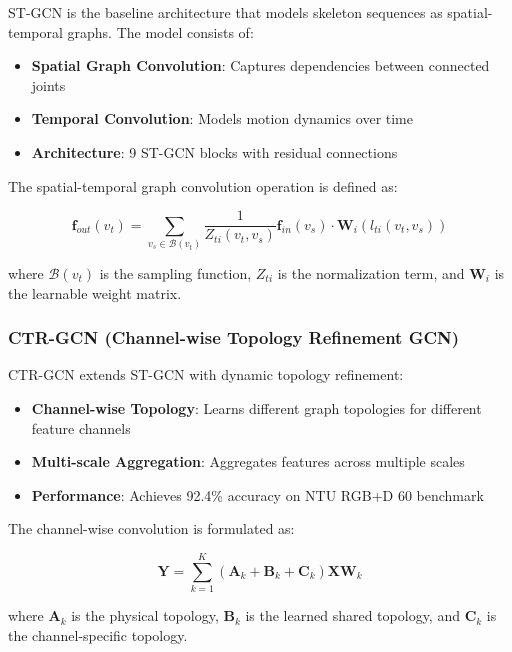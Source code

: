 \documentclass[11pt,a4paper]{article}
\begin{document}
ST-GCN is the baseline architecture that models skeleton sequences as spatial-temporal graphs. The model consists of:

\begin{itemize}
    \item \textbf{Spatial Graph Convolution}: Captures dependencies between connected joints
    \item \textbf{Temporal Convolution}: Models motion dynamics over time
    \item \textbf{Architecture}: 9 ST-GCN blocks with residual connections
\end{itemize}

The spatial-temporal graph convolution operation is defined as:

\begin{equation}
\mathbf{f}_{out}(v_t) = \sum_{v_s \in \mathcal{B}(v_t)} \frac{1}{Z_{ti}(v_t, v_s)} \mathbf{f}_{in}(v_s) \cdot \mathbf{W}_i(l_{ti}(v_t, v_s))
\end{equation}

where $\mathcal{B}(v_t)$ is the sampling function, $Z_{ti}$ is the normalization term, and $\mathbf{W}_i$ is the learnable weight matrix.

\subsubsection{CTR-GCN (Channel-wise Topology Refinement GCN)}

CTR-GCN extends ST-GCN with dynamic topology refinement:

\begin{itemize}
    \item \textbf{Channel-wise Topology}: Learns different graph topologies for different feature channels
    \item \textbf{Multi-scale Aggregation}: Aggregates features across multiple scales
    \item \textbf{Performance}: Achieves 92.4\% accuracy on NTU RGB+D 60 benchmark
\end{itemize}

The channel-wise convolution is formulated as:

\begin{equation}
\mathbf{Y} = \sum_{k=1}^{K} (\mathbf{A}_k + \mathbf{B}_k + \mathbf{C}_k) \mathbf{X} \mathbf{W}_k
\end{equation}

where $\mathbf{A}_k$ is the physical topology, $\mathbf{B}_k$ is the learned shared topology, and $\mathbf{C}_k$ is the channel-specific topology.
\end{document}
